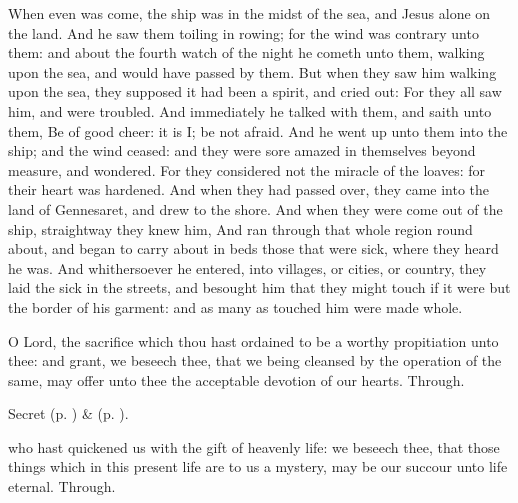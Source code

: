 

 When even was come, the ship was in the midst of the sea, and Jesus alone on the land. And he saw them toiling in rowing; for the wind was contrary unto them: and about the fourth watch of the night he cometh unto them, walking upon the sea, and would have passed by them. But when they saw him walking upon the sea, they supposed it had been a spirit, and cried out: For they all saw him, and were troubled. And immediately he talked with them, and saith unto them, Be of good cheer: it is I; be not afraid. And he went up unto them into the ship; and the wind ceased: and they were sore amazed in themselves beyond measure, and wondered. For they considered not the miracle of the loaves: for their heart was hardened. And when they had passed over, they came into the land of Gennesaret, and drew to the shore. And when they were come out of the ship, straightway they knew him, And ran through that whole region round about, and began to carry about in beds those that were sick, where they heard he was. And whithersoever he entered, into villages, or cities, or country, they laid the sick in the streets, and besought him that they might touch if it were but the border of his garment: and as many as touched him were made whole.


\secret
{} O Lord, the sacrifice which thou hast ordained to be a worthy propitiation unto thee: and grant, we beseech thee, that we being cleansed by the operation of the same, may offer unto thee the acceptable devotion of our hearts. Through.

\begin{rubric}
     Secret  (p. \pageref{AshWednesdayMassSecret}) \&   (p. \pageref{SPLivingDeparted}).
\end{rubric}


\postcommunion
{} who hast quickened us with the gift of heavenly life: we beseech thee, that those things which in this present life are to us a mystery, may be our succour unto life eternal. Through.

